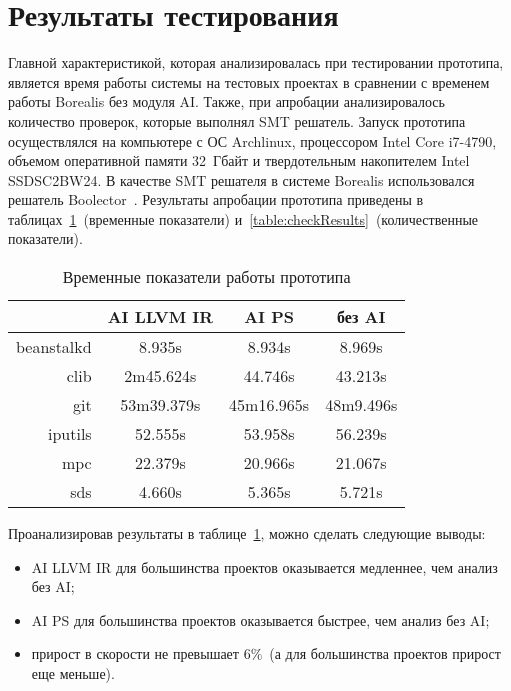 \section{Результаты тестирования}
Главной характеристикой, которая анализировалась при тестировании прототипа, 
является время работы системы на тестовых проектах в сравнении с временем
работы Borealis без модуля AI. Также, при апробации анализировалось количество 
проверок, которые выполнял SMT решатель. Запуск прототипа осуществлялся на 
компьютере с ОС Archlinux, процессором Intel Core i7-4790, объемом оперативной 
памяти 32~Гбайт и твердотельным накопителем Intel SSDSC2BW24. В качестве SMT 
решателя в системе Borealis использовался решатель Boolector~\cite{boolector}. 
Результаты апробации прототипа приведены в 
таблицах~\ref{table:timeResults}~(временные показатели) 
и~\ref{table:checkResults}~(количественные показатели).
\begin{table}
\captionsetup{skip=5pt}
\caption{Временные показатели работы прототипа}
\centering
\begin{tabular}{|r|c|c|c|}
\hline
           & AI LLVM IR   & AI PS        & без AI    \\ \hline
beanstalkd & 8.935s       & 8.934s       & 8.969s    \\ \hline
clib       & 2m45.624s    & 44.746s      & 43.213s   \\ \hline
git        & 53m39.379s   & 45m16.965s   & 48m9.496s \\ \hline
iputils    & 52.555s      & 53.958s      & 56.239s   \\ \hline
mpc        & 22.379s      & 20.966s      & 21.067s   \\ \hline
sds        & 4.660s       & 5.365s       & 5.721s    \\ \hline
\end{tabular}
\label{table:timeResults}
\end{table}

Проанализировав результаты в таблице~\ref{table:timeResults}, можно сделать 
следующие выводы:
\begin{itemize}
\item AI LLVM IR для большинства проектов оказывается медленнее, чем
анализ без AI;
\item AI PS для большинства проектов оказывается быстрее, чем анализ
без AI;
\item прирост в скорости не превышает $6\%$~(а для большинства проектов прирост
еще меньше).
\end{itemize}

